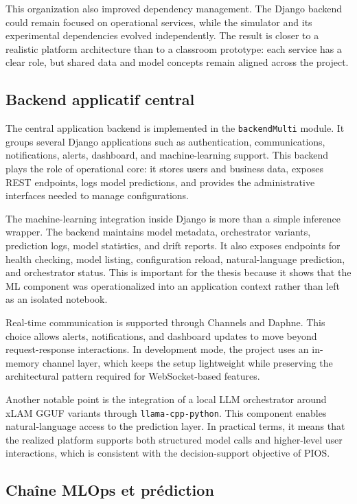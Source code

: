 This organization also improved dependency management. The Django backend could remain focused on operational services, while the simulator and its experimental dependencies evolved independently. The result is closer to a realistic platform architecture than to a classroom prototype: each service has a clear role, but shared data and model concepts remain aligned across the project.

\subsection{Backend applicatif central}
\label{sec:core-backend-realization}

The central application backend is implemented in the \texttt{backendMulti} module. It groups several Django applications such as authentication, communications, notifications, alerts, dashboard, and machine-learning support. This backend plays the role of operational core: it stores users and business data, exposes REST endpoints, logs model predictions, and provides the administrative interfaces needed to manage configurations.

The machine-learning integration inside Django is more than a simple inference wrapper. The backend maintains model metadata, orchestrator variants, prediction logs, model statistics, and drift reports. It also exposes endpoints for health checking, model listing, configuration reload, natural-language prediction, and orchestrator status. This is important for the thesis because it shows that the ML component was operationalized into an application context rather than left as an isolated notebook.

Real-time communication is supported through Channels and Daphne. This choice allows alerts, notifications, and dashboard updates to move beyond request-response interactions. In development mode, the project uses an in-memory channel layer, which keeps the setup lightweight while preserving the architectural pattern required for WebSocket-based features.

Another notable point is the integration of a local LLM orchestrator around xLAM GGUF variants through \texttt{llama-cpp-python}. This component enables natural-language access to the prediction layer. In practical terms, it means that the realized platform supports both structured model calls and higher-level user interactions, which is consistent with the decision-support objective of PIOS.

\subsection{Chaîne MLOps et prédiction}
\label{sec:mlops-realization}

